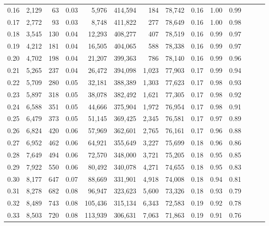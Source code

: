 \begin{tabular}{rrrrrrrrrrrrrr}
0.16 &   2,129 &     63 &  0.03 &    5,976 &  414,594 &     184 &  78,742 &  0.16 &  1.00 &      0.99 \\
0.17 &   2,772 &     93 &  0.03 &    8,748 &  411,822 &     277 &  78,649 &  0.16 &  1.00 &      0.98 \\
0.18 &   3,545 &    130 &  0.04 &   12,293 &  408,277 &     407 &  78,519 &  0.16 &  0.99 &      0.97 \\
0.19 &   4,212 &    181 &  0.04 &   16,505 &  404,065 &     588 &  78,338 &  0.16 &  0.99 &      0.97 \\
0.20 &   4,702 &    198 &  0.04 &   21,207 &  399,363 &     786 &  78,140 &  0.16 &  0.99 &      0.96 \\
0.21 &   5,265 &    237 &  0.04 &   26,472 &  394,098 &   1,023 &  77,903 &  0.17 &  0.99 &      0.94 \\
0.22 &   5,709 &    280 &  0.05 &   32,181 &  388,389 &   1,303 &  77,623 &  0.17 &  0.98 &      0.93 \\
0.23 &   5,897 &    318 &  0.05 &   38,078 &  382,492 &   1,621 &  77,305 &  0.17 &  0.98 &      0.92 \\
0.24 &   6,588 &    351 &  0.05 &   44,666 &  375,904 &   1,972 &  76,954 &  0.17 &  0.98 &      0.91 \\
0.25 &   6,479 &    373 &  0.05 &   51,145 &  369,425 &   2,345 &  76,581 &  0.17 &  0.97 &      0.89 \\
0.26 &   6,824 &    420 &  0.06 &   57,969 &  362,601 &   2,765 &  76,161 &  0.17 &  0.96 &      0.88 \\
0.27 &   6,952 &    462 &  0.06 &   64,921 &  355,649 &   3,227 &  75,699 &  0.18 &  0.96 &      0.86 \\
0.28 &   7,649 &    494 &  0.06 &   72,570 &  348,000 &   3,721 &  75,205 &  0.18 &  0.95 &      0.85 \\
0.29 &   7,922 &    550 &  0.06 &   80,492 &  340,078 &   4,271 &  74,655 &  0.18 &  0.95 &      0.83 \\
0.30 &   8,177 &    647 &  0.07 &   88,669 &  331,901 &   4,918 &  74,008 &  0.18 &  0.94 &      0.81 \\
0.31 &   8,278 &    682 &  0.08 &   96,947 &  323,623 &   5,600 &  73,326 &  0.18 &  0.93 &      0.79 \\
0.32 &   8,489 &    743 &  0.08 &  105,436 &  315,134 &   6,343 &  72,583 &  0.19 &  0.92 &      0.78 \\
0.33 &   8,503 &    720 &  0.08 &  113,939 &  306,631 &   7,063 &  71,863 &  0.19 &  0.91 &      0.76 \\

\end{tabular}
